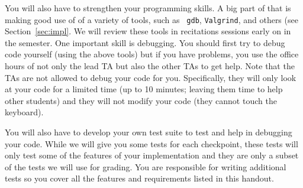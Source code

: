 You will also have to strengthen your programming skills.  A big part
of that is making good use of of a variety of tools, such as {\tt
gdb}, {\tt Valgrind}, and others (see Section~\ref{sec:impl}.  We will
review these tools in recitations sessions early on in the semester.
One important skill is debugging.  You should first try to debug code
yourself (using the above tools) but if you have problems, you 
use the office hours of not only the lead TA but also the
other TAs to get help.  Note that the TAs are not allowed to debug
your code for you. Specifically, they will only look at your code for
a limited time (up to 10 minutes; leaving them time to help other
students) and they will not modify your code (they cannot touch the
keyboard).

You will also have to develop your own test suite to test and help in
debugging your code.  While we will give you some tests for each
checkpoint, these tests will only test some of the features of your
implementation and they are only a subset of the tests we will use for
grading.  You are responsible for writing additional tests so you
cover all the features and requirements listed in this handout.


